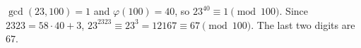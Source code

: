 $\gcd(23,100)=1$ and $\varphi(100)=40$, so $23^{40}\equiv1\pmod{100}$. Since $2323=58\cdot40+3$, $23^{2323}\equiv23^3=12167\equiv67\pmod{100}$. The last two digits are $\boxed{67}$.
